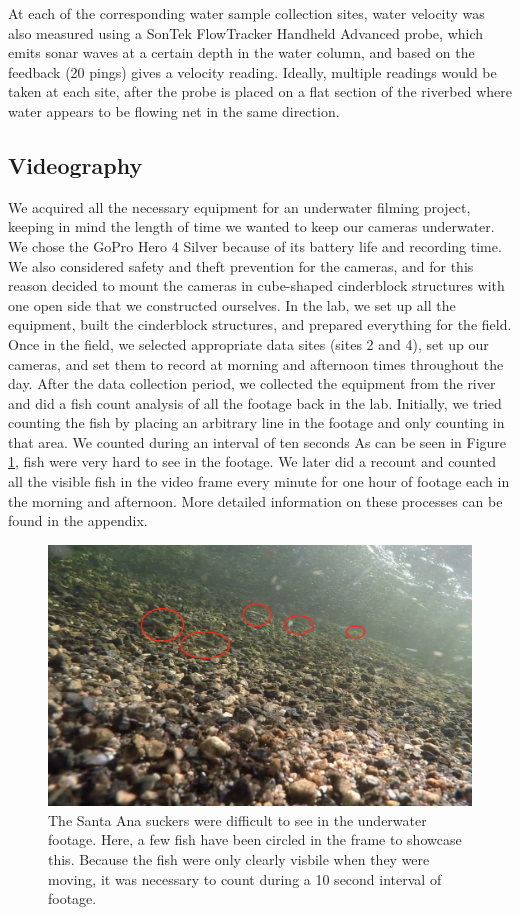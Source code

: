 \documentclass{article}\usepackage[]{graphicx}\usepackage[]{color}
\begin{document}
At each of the corresponding water sample collection sites, water velocity was also measured using a SonTek FlowTracker Handheld Advanced probe, which emits sonar waves at a certain depth in the water column, and based on the feedback (20 pings) gives a velocity reading. Ideally, multiple readings would be taken at each site, after the probe is placed on a flat section of the riverbed where water appears to be flowing net in the same direction. 

\subsection{Videography}

We acquired all the necessary equipment for an underwater filming project, keeping in mind the length of time we wanted to keep our cameras underwater. We chose the GoPro Hero 4 Silver because of its battery life and recording time. We also considered safety and theft prevention for the cameras, and for this reason decided to mount the cameras in cube-shaped cinderblock structures with one open side that we constructed ourselves. In the lab, we set up all the equipment, built the cinderblock structures, and prepared everything for the field. Once in the field, we selected appropriate data sites (sites 2 and 4), set up our cameras, and set them to record at morning and afternoon times throughout the day. After the data collection period, we collected the equipment from the river and did a fish count analysis of all the footage back in the lab. Initially, we tried counting the fish by placing an arbitrary line in the footage and only counting in that area. We counted during an interval of ten seconds As can be seen in Figure \ref{fig:wherefish}, fish were very hard to see in the footage. We later did a recount and counted all the visible fish in the video frame every minute for one hour of footage each in the morning and afternoon. More detailed information on these processes can be found in the appendix.
\begin{figure}
\includegraphics[scale=.4]{Videography_figures/wherefish}
\caption{The Santa Ana suckers were difficult to see in the underwater footage. Here, a few fish have been circled in the frame to showcase this. Because the fish were only clearly visbile when they were moving, it was necessary to count during a 10 second interval of footage.}
\label{fig:wherefish}
\end{figure}
\end{document}
